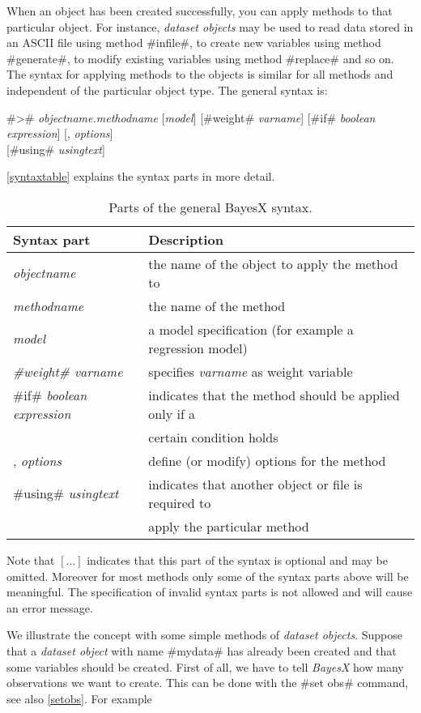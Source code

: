 When an object has been created successfully, you can apply
methods to that particular object. For instance, {\em dataset
objects} may be used to read data stored in an ASCII file using
method #infile#, to create new variables using method #generate#,
to modify existing variables using method #replace# and so on. The
syntax for applying methods to the objects is similar for all
methods and independent of the particular object type. The general
syntax is:  

#># {\em objectname.methodname} [{\em model}] [#weight# {\em varname}] [#if# {\em boolean expression}] [, {\em options}] \\
\hspace*{4.8cm} [#using# {\em usingtext}]

\autoref{syntaxtable} explains the syntax parts in more detail.


\begin{table}[ht]
 \centering
\begin{tabular}{|l|l|}
\hline
Syntax part & Description \\
\hline
{\em objectname} & the name of the object to apply the method to \\
{\em methodname} & the name of the method \\
{\em model} & a model specification (for example a regression model) \\
{\em #weight# varname} & specifies {\em varname} as weight variable \\
#if# {\em boolean expression} & indicates that the method should be applied only if a \\
& certain condition holds \\
, {\em options} & define (or modify) options for the method \\
#using# {\em usingtext} & indicates that another object or file is required to \\
& apply the particular method \\
\hline
\end{tabular}
{\em \caption{\label{syntaxtable}Parts of the general BayesX
syntax.}}
\end{table}

Note that $[\dots]$ indicates that this part of the syntax is
optional and may be omitted. Moreover for most methods only some
of the syntax parts above will be meaningful. The specification of
invalid syntax parts is not allowed and will cause an error
message.

We illustrate the concept with some simple methods of {\em dataset
objects}. Suppose that a {\em dataset object} with name #mydata#
has already been created and that some variables should be
created. First of all, we have to tell {\em BayesX} how many
observations we want to create. This can be done with the
 #set obs# command, see also \autoref{setobs}. For example


